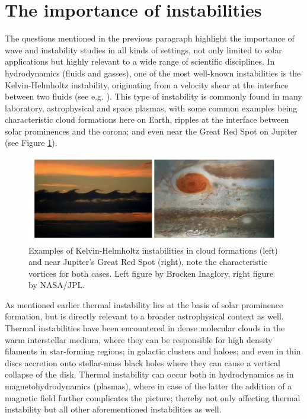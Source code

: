 \section{The importance of instabilities}
The questions mentioned in the previous paragraph highlight the importance of wave and instability studies in all kinds of settings, not only limited to solar applications but highly relevant to a wide range of scientific disciplines. In hydrodynamics (fluids and gasses), one of the most well-known instabilities is the Kelvin-Helmholtz instability, originating from a velocity shear at the interface between two fluids (see e.g. \citet{book_choudhuri}). This type of instability is commonly found in many laboratory, astrophysical and space plasmas, with some common examples being characteristic cloud formations here on Earth, ripples at the interface between solar prominences and the corona; and even near the Great Red Spot on Jupiter (see Figure \ref{fig: kh_instability}).

\begin{figure}[b]
  \centering
  \includegraphics[width=\textwidth]{instabilities.png}
  \caption{
    Examples of Kelvin-Helmholtz instabilities in cloud formations (left) and near Jupiter's Great Red Spot (right), note the characteristic vortices for both cases. Left figure by Brocken Inaglory, right figure by NASA/JPL.
  }
  \label{fig: kh_instability}
\end{figure}

As mentioned earlier thermal instability lies at the basis of solar prominence formation, but is directly relevant to a broader astrophysical context as well. Thermal instabilities have been encountered in dense molecular clouds in the warm interstellar medium, where they can be responsible for high density filaments in star-forming regions; in galactic clusters and haloes; and even in thin discs accretion onto stellar-mass black holes where they can cause a vertical collapse of the disk. Thermal instability can occur both in hydrodynamics as in magnetohydrodynamics (plasmas), where in case of the latter the addition of a magnetic field further complicates the picture; thereby not only affecting thermal instability but all other aforementioned instabilities as well.

